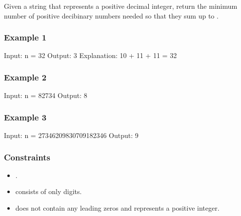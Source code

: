 \documentclass[letterpaper,12pt,english]{book}
\begin{document}
\sphinxAtStartPar
Given a string  that represents a positive decimal integer, return the minimum number of positive deci\sphinxhyphen{}binary numbers needed so that they sum up to .


\subsubsection{Example 1}
\label{\detokenize{Mathematics/09_MTH_1689_Partitioning_Into_Minimum_Number_Of_Deci-Binary_Numbers:example-1}}
\begin{sphinxVerbatim}[commandchars=\\\{\}]
Input: n = \PYGZdq{}32\PYGZdq{}
Output: 3
Explanation: 10 + 11 + 11 = 32
\end{sphinxVerbatim}


\subsubsection{Example 2}
\label{\detokenize{Mathematics/09_MTH_1689_Partitioning_Into_Minimum_Number_Of_Deci-Binary_Numbers:example-2}}
\begin{sphinxVerbatim}[commandchars=\\\{\}]
Input: n = \PYGZdq{}82734\PYGZdq{}
Output: 8
\end{sphinxVerbatim}


\subsubsection{Example 3}
\label{\detokenize{Mathematics/09_MTH_1689_Partitioning_Into_Minimum_Number_Of_Deci-Binary_Numbers:example-3}}
\begin{sphinxVerbatim}[commandchars=\\\{\}]
Input: n = \PYGZdq{}27346209830709182346\PYGZdq{}
Output: 9
\end{sphinxVerbatim}


\subsubsection{Constraints}
\label{\detokenize{Mathematics/09_MTH_1689_Partitioning_Into_Minimum_Number_Of_Deci-Binary_Numbers:constraints}}\begin{itemize}
\item {} 
\sphinxAtStartPar
{}.

\item {} 
\sphinxAtStartPar
{} consists of only digits.

\item {} 
\sphinxAtStartPar
{} does not contain any leading zeros and represents a positive integer.

\end{itemize}
\end{document}
